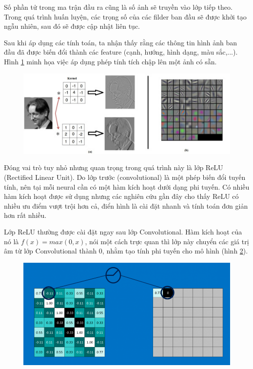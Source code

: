 Số phần tử trong ma trận đầu ra cũng là số ảnh sẽ truyền vào lớp tiếp theo. Trong quá trình huấn luyện, các trọng số của các filder ban đầu sẽ được khởi tạo ngẫu nhiên, sau đó sẽ được cập nhật liên tục.

Sau khi áp dụng các tính toán, ta nhận thấy rằng các thông tin hình ảnh ban đầu đã được biến đổi thành các feature (cạnh, hướng, hình dạng, màu sắc,...). Hình \ref{chap2:result_filter} minh họa việc áp dụng phép tính tích chập lên một ảnh có sẵn.

\begin{center}
    \begin{figure}[H]
    \centering
    \includegraphics[width=0.8\columnwidth]{images/chap2/viduapplyconvu.jpg}
    \label{chap2:result_filter}
    \end{figure}
\end{center}


Đóng vai trò tuy nhỏ nhưng quan trọng trong quá trình này là lớp ReLU (Rectified Linear Unit). Do lớp trước (convolutional) là một phép biến đổi tuyến tính, nên tại mỗi neural cần có một hàm kích hoạt dưới dạng phi tuyến. Có nhiều hàm kích hoạt được sử dụng nhưng các nghiên cứu gần đây cho thấy ReLU có nhiều ưu điểm vượt trội hơn cả, điển hình là cài đặt nhanh và tính toán đơn giản hơn rất nhiều.

Lớp ReLU thường được cài đặt ngay sau lớp Convolutional. Hàm kích hoạt của nó là $f(x) = max(0, x)$, nói một cách trực quan thì lớp này chuyển các giá trị âm từ lớp Convolutional thành 0, nhằm tạo tính phi tuyến cho mô hình (hình \ref{chap2:relu}).
\begin{center}
    \begin{figure}[H]
    \centering
    \includegraphics[width=0.8\columnwidth]{images/chap2/relu_array.png}
    \label{chap2:relu}
    \end{figure}
\end{center}

